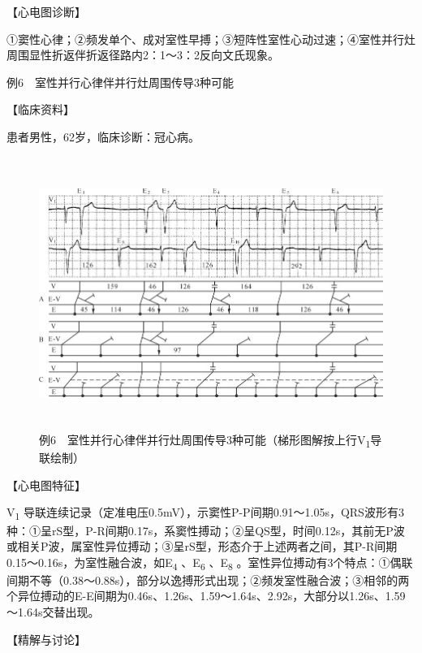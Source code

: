 【心电图诊断】

①窦性心律；②频发单个、成对室性早搏；③短阵性室性心动过速；④室性并行灶周围显性折返伴折返径路内2：1～3：2反向文氏现象。

例6　室性并行心律伴并行灶周围传导3种可能

【临床资料】

患者男性，62岁，临床诊断：冠心病。

\begin{figure}[!htbp]
 \centering
 \includegraphics[width=5.75in,height=3.48958in]{./images/Image00764.jpg}
 \captionsetup{justification=centering}
 \caption{例6　室性并行心律伴并行灶周围传导3种可能（梯形图解按上行V\textsubscript{1}导联绘制）}
 \label{fig50-6}
  \end{figure} 


【心电图特征】

V\textsubscript{1}
导联连续记录（定准电压0.5mV），示窦性P-P间期0.91～1.05s，QRS波形有3种：①呈rS型，P-R间期0.17s，系窦性搏动；②呈QS型，时间0.12s，其前无P波或相关P波，属室性异位搏动；③呈rS型，形态介于上述两者之间，其P-R间期0.15～0.16s，为室性融合波，如E\textsubscript{4}
、E\textsubscript{6} 、E\textsubscript{8}
。室性异位搏动有3个特点：①偶联间期不等（0.38～0.88s），部分以逸搏形式出现；②频发室性融合波；③相邻的两个异位搏动的E-E间期为0.46s、1.26s、1.59～1.64s、2.92s，大部分以1.26s、1.59～1.64s交替出现。

【精解与讨论】

